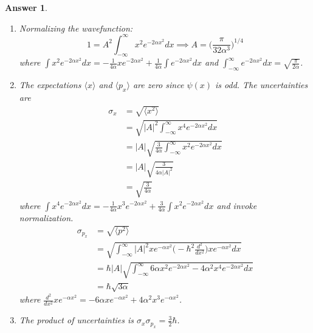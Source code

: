 \documentclass[a4paper]{article}
\newtheorem{ans}{Answer}[section]
\theoremstyle{new}
\begin{document}
\begin{ans}\leavevmode
\begin{enumerate}[label=(\alph*)]
\item Normalizing the wavefunction:
$$1=A^2\int_{-\infty}^\infty x^2e^{-2\alpha x^2}dx\implies A=\bigg(\frac{\pi}{32\alpha^3}\bigg)^{1/4}$$
where $\int x^2e^{-2\alpha x^2}dx=-\frac{1}{4\alpha}xe^{-2\alpha x^2}+\frac{1}{4\alpha}\int e^{-2\alpha x^2}dx$ and $\int_{-\infty}^\infty e^{-2\alpha x^2}dx=\sqrt{\frac{\pi}{2\alpha}}$.
\item The expectations $\langle x\rangle$ and $\langle p_x\rangle$ are zero since $\psi(x)$ is odd. The uncertainties are
\begin{align}
\sigma_x&=\sqrt{\langle x^2\rangle}\nonumber\\&=\sqrt{|A|^2\int_{-\infty}^\infty x^4e^{-2\alpha x^2}dx}\nonumber\\&=|A|\sqrt{\frac{3}{4\alpha}\int_{-\infty}^\infty x^2e^{-2\alpha x^2}dx}\nonumber\\&=|A|\sqrt{\frac{3}{4\alpha|A|^2}}\nonumber\\&=\sqrt{\frac{3}{4\alpha}}\nonumber
\end{align}
where $\int x^4e^{-2\alpha x^2}dx=-\frac{1}{4\alpha}x^3e^{-2\alpha x^2}+\frac{3}{4\alpha}\int x^2e^{-2\alpha x^2}dx$ and invoke normalization.
\begin{align}
\sigma_{p_x}&=\sqrt{\langle p^2\rangle}\nonumber\\&=\sqrt{\int_{-\infty}^\infty |A|^2xe^{-\alpha x^2}\bigg(-\hbar^2\frac{d^2}{dx^2}\bigg)xe^{-\alpha x^2}dx}\nonumber\\&=\hbar|A|\sqrt{\int_{-\infty}^\infty 6\alpha x^2e^{-2\alpha x^2}-4\alpha^2x^4e^{-2\alpha x^2}dx}\nonumber\\&=\hbar\sqrt{3\alpha}\nonumber
\end{align}
where $\frac{d^2}{dx^2}xe^{-\alpha x^2}=-6\alpha xe^{-\alpha x^2}+4\alpha^2x^3e^{-\alpha x^2}$. 
\item The product of uncertainties is $\sigma_x \sigma_{p_x}=\frac{3}{2}\hbar$.
\end{enumerate}
\end{ans}
\newpage
\end{document}

